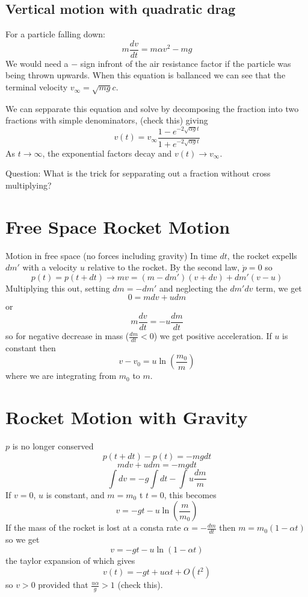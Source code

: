 \documentclass{homework}
\begin{document}
\subsection{Vertical motion with quadratic drag}

For a particle falling down:
\[m\frac{dv}{dt} = m\alpha v^2 - mg\]
We would need a $-$ sign infront of the air resistance factor if the particle was being thrown upwards. When this equation is ballanced we can see that the terminal velocity $v_{\infty} = \sqrt{mg}{c}$. 

We can sepparate this equation and solve by  decomposing the fraction into two fractions with simple denominators, (check this) giving
\[v(t) = v_{\infty} \frac{1 - e^{-2\sqrt{\alpha g }t}}{1 + e^{-2\sqrt{\alpha g }t}}\]
As $t \rightarrow \infty$, the exponential factors decay and $v(t) \rightarrow v_{\infty}$.

Question: What is the trick for sepparating out a fraction without cross multiplying?




\section{Free Space Rocket Motion}
Motion in free space (no forces including gravity)
In time $dt$, the rocket expells $dm'$ with a velocity $u$ relative to the rocket. By the second law, $\dot p = 0$ so 
\[p(t) = p(t + dt) \rightarrow mv = (m - dm')(v + dv) + dm'(v - u)\]
Multiplying this out, setting $dm = -dm'$ and neglecting the $dm'dv$ term, we get
\[0 = mdv + udm\]
or
\[m\frac{dv}{dt} = -u\frac{dm}{dt}\]
so for negative decrease in mass ($\frac{dm}{dt} <0$) we get positive acceleration. If $u$ is constant then 
\[v - v_0 = u\ln \left( \frac{m_0}{m} \right)\]
where we are integrating from $m_0$ to $m$. 

\section{Rocket Motion with Gravity}
$p$ is no longer conserved
\[p(t + dt) - p(t) = -mgdt\]
\[mdv + udm = -mgdt\]
\[\int dv = -g\int dt - \int u \frac{dm}{m}\]
If $v = 0$, $u$ is constant, and $m = m_0$ t $t = 0$, this becomes 
\[v = -gt -u\ln \left(\frac{m}{m_0} \right) \]
If the mass of the rocket is lost at a consta rate $\alpha = - \frac{dm}{dt}$ then $m = m_0(1 - \alpha t)$ so we get
\[v = -gt -u\ln(1 - \alpha t) \]
the taylor expansion of which gives
\[v(t) = -gt + u\alpha t + O(t^2)\]
so $v > 0$ provided that $\frac{u\alpha}{g} > 1$ (check this).
\end{document}
